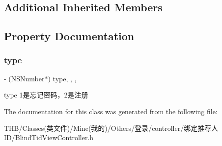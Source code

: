 \subsection*{Additional Inherited Members}


\subsection{Property Documentation}
\mbox{\label{interface_blind_tid_view_controller_a8575f85d7ff33fba2aef094d272e0d94}} 
\subsubsection{\texorpdfstring{type}{type}}
{\footnotesize\ttfamily -\/ (N\+S\+Number$\ast$) type\hspace{0.3cm}{\ttfamily [read]}, {\ttfamily [write]}, {\ttfamily [nonatomic]}, {\ttfamily [assign]}}

type 1是忘记密码，2是注册 

The documentation for this class was generated from the following file\+:\begin{DoxyCompactItemize}
\item 
T\+H\+B/\+Classes(类文件)/\+Mine(我的)/\+Others/登录/controller/绑定推荐人\+I\+D/Blind\+Tid\+View\+Controller.\+h\end{DoxyCompactItemize}
